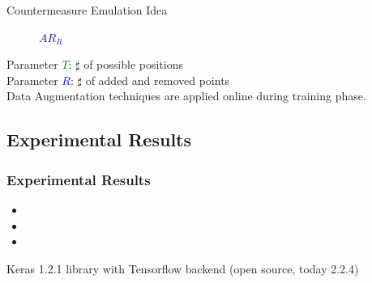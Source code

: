 \begin{frame}
\begin{block}{Countermeasure Emulation Idea}
\begin{figure}
\begin{minipage}[b]{0.5\linewidth}
    \caption{\textcolor{blue}{$AR_R$}}
  \end{minipage} 
\end{figure}
\vspace{-9pt}
Parameter  \textcolor{green}{$T$}: $\sharp$ of possible positions \\
Parameter \textcolor{blue}{$R$}: $\sharp$ of added and removed points \\
Data Augmentation techniques are applied online during training phase.
\end{block}
\end{frame}


\subsection{Experimental Results}
\begin{frame}
\frametitle{Experimental Results}
\begin{itemize}
\item {}
\item {}
\item {}
\end{itemize}

\vspace*{3pt}
Keras 1.2.1 library with Tensorflow backend \cite{keras} (open source, today 2.2.4)


\end{frame}

